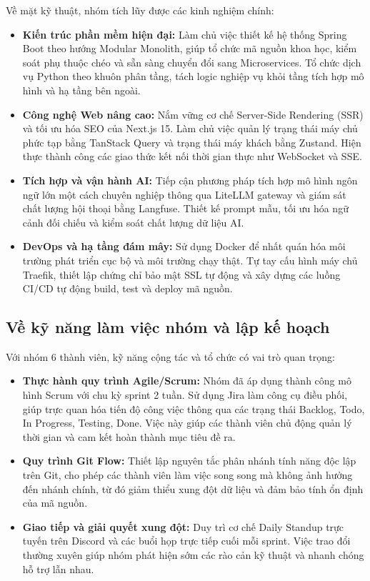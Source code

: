 Về mặt kỹ thuật, nhóm tích lũy được các kinh nghiệm chính:
\begin{itemize}
    \item \textbf{Kiến trúc phần mềm hiện đại:} Làm chủ việc thiết kế hệ thống Spring Boot theo hướng Modular Monolith, giúp tổ chức mã nguồn khoa học, kiểm soát phụ thuộc chéo và sẵn sàng chuyển đổi sang Microservices. Tổ chức dịch vụ Python theo khuôn phân tầng, tách logic nghiệp vụ khỏi tầng tích hợp mô hình và hạ tầng bên ngoài.
    \item \textbf{Công nghệ Web nâng cao:} Nắm vững cơ chế Server-Side Rendering (SSR) và tối ưu hóa SEO của Next.js 15. Làm chủ việc quản lý trạng thái máy chủ phức tạp bằng TanStack Query và trạng thái máy khách bằng Zustand. Hiện thực thành công các giao thức kết nối thời gian thực như WebSocket và SSE.
    \item \textbf{Tích hợp và vận hành AI:} Tiếp cận phương pháp tích hợp mô hình ngôn ngữ lớn một cách chuyên nghiệp thông qua LiteLLM gateway và giám sát chất lượng hội thoại bằng Langfuse. Thiết kế prompt mẫu, tối ưu hóa ngữ cảnh đối chiếu và kiểm soát chất lượng dữ liệu AI.
    \item \textbf{DevOps và hạ tầng đám mây:} Sử dụng Docker để nhất quán hóa môi trường phát triển cục bộ và môi trường chạy thật. Tự tay cấu hình máy chủ Traefik, thiết lập chứng chỉ bảo mật SSL tự động và xây dựng các luồng CI/CD tự động build, test và deploy mã nguồn.
\end{itemize}

\FloatBarrier
\subsection{Về kỹ năng làm việc nhóm và lập kế hoạch}

Với nhóm 6 thành viên, kỹ năng cộng tác và tổ chức có vai trò quan trọng:
\begin{itemize}
    \item \textbf{Thực hành quy trình Agile/Scrum:} Nhóm đã áp dụng thành công mô hình Scrum với chu kỳ sprint 2 tuần. Sử dụng Jira làm công cụ điều phối, giúp trực quan hóa tiến độ công việc thông qua các trạng thái Backlog, Todo, In Progress, Testing, Done. Việc này giúp các thành viên chủ động quản lý thời gian và cam kết hoàn thành mục tiêu đề ra.
    \item \textbf{Quy trình Git Flow:} Thiết lập nguyên tắc phân nhánh tính năng độc lập trên Git, cho phép các thành viên làm việc song song mà không ảnh hưởng đến nhánh chính, từ đó giảm thiểu xung đột dữ liệu và đảm bảo tính ổn định của mã nguồn.
    \item \textbf{Giao tiếp và giải quyết xung đột:} Duy trì cơ chế Daily Standup trực tuyến trên Discord và các buổi họp trực tiếp cuối mỗi sprint. Việc trao đổi thường xuyên giúp nhóm phát hiện sớm các rào cản kỹ thuật và nhanh chóng hỗ trợ lẫn nhau.
\end{itemize}


